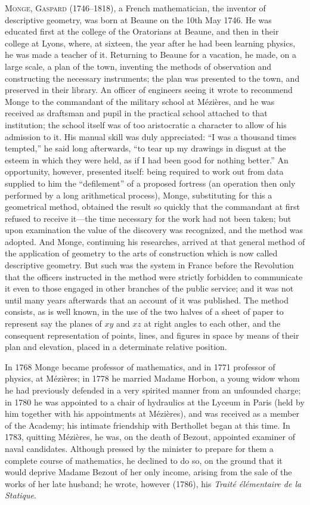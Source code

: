 \documentclass[11pt,a4paper]{book}
\begin{document}
\textsc{Monge, Gaspard} (1746--1818), a French mathematician, the inventor of descriptive geometry, was born at Beaune on the 10th May 1746. He was educated first at the college of the Oratorians at Beaune, and then in their college at Lyons, where, at sixteen, the year after he had been learning physics, he was made a teacher of it. Returning to Beaune for a vacation, he made, on a large scale, a plan of the town, inventing the methods of observation and constructing the necessary instruments; the plan was presented to the town, and preserved in their library. An officer of engineers seeing it wrote to recommend Monge to the commandant of the military school at M\'ezi\`eres, and he was received as draftsman and pupil in the practical school attached to that institution; the school itself was of too aristocratic a character to allow of his admission to it. His manual skill was duly appreciated: ``I was a thousand times tempted,'' he said long afterwards, ``to tear up my drawings in disgust at the esteem in which they were held, as if I had been good for nothing better.'' An opportunity, however, presented itself: being required to work out from data supplied to him the ``defilement'' of a proposed fortress (an operation then only performed by a long arithmetical process), Monge, substituting for this a geometrical method, obtained the result so quickly that the commandant at first refused to receive it---the time necessary for the work had not been taken; but upon examination the value of the discovery was recognized, and the method was adopted. And Monge, continuing his researches, arrived at that general method of the application of geometry to the arts of construction which is now called descriptive geometry. But such was the system in France before the Revolution that the officers instructed in the method were strictly forbidden to communicate it even to those engaged in other branches of the public service; and it was not until many years afterwards that an account of it was published. The method consists, as is well known, in the use of the two halves of a sheet of paper to represent say the planes of $xy$ and $xz$ at right angles to each other, and the consequent representation of points, lines, and figures in space by means of their plan and elevation, placed in a determinate relative position.

In 1768 Monge became professor of mathematics, and in 1771 professor of physics, at M\'ezi\`eres; in 1778 he married Madame Horbon, a young widow whom he had previously defended in a very spirited manner from an unfounded charge; in 1780 he was appointed to a chair of hydraulics at the Lyceum in Paris (held by him together with his appointments at M\'ezi\`eres), and was received as a member of the Academy; his intimate friendship with Berthollet began at this time. In 1783, quitting M\'ezi\`eres, he was, on the death of Bezout, appointed examiner of naval candidates. Although pressed by the minister to prepare for them a complete course of mathematics, he declined to do so, on the ground that it would deprive Madame Bezout of her only income, arising from the sale of the works of her late husband; he wrote, however (1786), his \textit{Trait\'e \'el\'ementaire de la Statique}.
\end{document}
